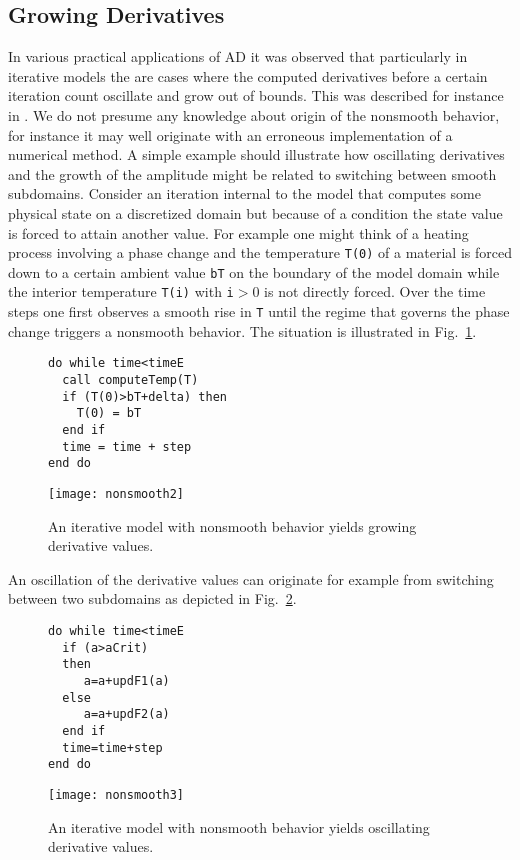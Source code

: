 \documentclass{article}
\newcommand{\reffig}[1]{{Fig.~\ref{#1}}}
\begin{document}
\subsection{Growing Derivatives}\label{sec:GrowingDerivatives}
In various practical applications of AD it was observed that particularly in iterative
models the are cases where the  computed derivatives before a certain iteration count 
oscillate and grow out of bounds. 
This was described for instance in \cite{tfs-delayed}. 
We do not presume any knowledge about origin of the nonsmooth behavior, for instance
it may well originate with an erroneous implementation of a numerical method. 
A simple example should illustrate how oscillating derivatives and the growth 
of the amplitude might be related to switching between smooth subdomains. 
Consider an iteration internal to the model that computes some physical state 
on a discretized domain but because of a condition the state value is 
forced to attain another value. For example one might think of a heating process involving 
a phase change and the temperature \lstinline{T(0)} of a 
material is forced down to a certain ambient 
value \lstinline{bT} on the boundary of the model domain while 
the interior temperature \lstinline{T(i)} with \lstinline{i}$>0$ is not directly forced.  
Over the time steps  one first observes a smooth rise in \lstinline{T} 
until the 
regime that governs the phase change triggers a nonsmooth behavior. 
The situation is illustrated in \reffig{fig:growingExample}.
\begin{figure}
\begin{minipage}{.48\textwidth}
\begin{lstlisting}[frame=single,numbers=none,xleftmargin=0ex]
do while time<timeE
  call computeTemp(T)
  if (T(0)>bT+delta) then 
    T(0) = bT 
  end if
  time = time + step
end do  
\end{lstlisting}
\end{minipage}
\hfill
\begin{minipage}{.4\textwidth}
\texttt{[image: nonsmooth2]}
\end{minipage}
\caption{An iterative model with nonsmooth behavior yields 
growing derivative values.}\label{fig:growingExample} 
\end{figure}
An oscillation of the derivative values can originate for example from 
switching between two subdomains as depicted in  \reffig{fig:oscillatingExample}.
\begin{figure}
\begin{minipage}{.48\textwidth}
\begin{lstlisting}[frame=single,numbers=none,xleftmargin=0ex]
do while time<timeE
  if (a>aCrit) 
  then
     a=a+updF1(a)
  else 	
     a=a+updF2(a)
  end if
  time=time+step
end do  
\end{lstlisting}
\end{minipage}
\hfill
\begin{minipage}{.4\textwidth}
\texttt{[image: nonsmooth3]}
\end{minipage}
\caption{An iterative model with nonsmooth behavior yields 
oscillating derivative values.}\label{fig:oscillatingExample} 
\end{figure}
\end{document}
